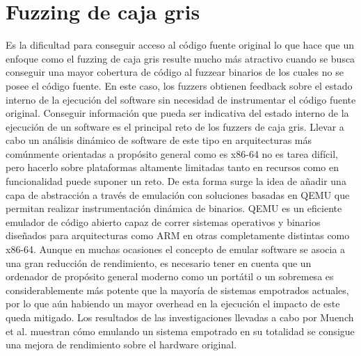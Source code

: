 \section{Fuzzing de caja gris}
Es la dificultad para conseguir acceso al código fuente original lo que hace que un enfoque como el fuzzing de caja gris resulte mucho más atractivo 
cuando se busca conseguir una mayor cobertura de código al fuzzear binarios de los cuales no se posee el código fuente. En este caso, los fuzzers obtienen 
feedback sobre el estado interno de la ejecución del software sin necesidad de instrumentar el código fuente original. Conseguir información que pueda ser
indicativa del estado interno de la ejecución de un software es el principal reto de los fuzzers de caja gris. 
Llevar a cabo un análisis dinámico de software de este tipo en arquitecturas más comúnmente orientadas a 
propósito general como es x86-64 no es tarea difícil, pero hacerlo sobre plataformas altamente limitadas tanto en recursos como en funcionalidad
puede suponer un reto. De esta forma surge la idea de añadir una capa de abstracción a través de emulación con soluciones basadas en QEMU\cite{qemu}
que permitan realizar instrumentación dinámica de binarios. QEMU es un eficiente emulador de código abierto capaz de correr sistemas operativos y binarios
diseñados para arquitecturas como ARM en otras completamente distintas como x86-64. Aunque en muchas ocasiones el concepto de emular software se asocia a
una gran reducción de rendimiento, es necesario tener en cuenta que un ordenador de propósito general moderno como un portátil o un sobremesa es 
considerablemente más potente que la mayoría de sistemas empotrados actuales, por lo que aún habiendo un mayor overhead en la ejecución el impacto de este queda mitigado.
Los resultados de las investigaciones llevadas a cabo por Muench et al.\cite{Muench2018} muestran cómo emulando un sistema empotrado en su totalidad 
se consigue una mejora de rendimiento sobre el hardware original.

